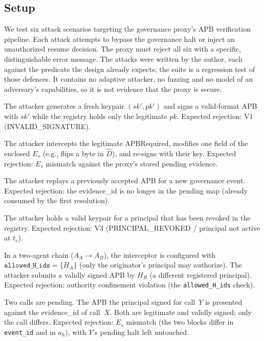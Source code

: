 \documentclass[11pt]{article}
\newcommand{\Es}{E_s}
\newcommand{\ahash}{a_h}   %
\begin{document}
\subsection{Setup}

We test six attack scenarios targeting the governance proxy's APB
verification pipeline.
Each attack attempts to bypass the governance halt or inject an
unauthorized resume decision.
The proxy must reject all six with a specific, distinguishable error
message. The attacks were written by the author, each against the
predicate the design already expects; the suite is a regression test of
those defences. It contains no adaptive attacker, no fuzzing and no model
of an adversary's capabilities, so it is not evidence that the proxy is
secure.

\begin{description}[leftmargin=2em, topsep=2pt, itemsep=2pt]
  \item[A1 (Wrong-key signing).]
        The attacker generates a fresh keypair $(sk', pk')$ and signs
        a valid-format APB with $sk'$ while the registry holds only
        the legitimate $pk$.
        Expected rejection: V1 (INVALID\_SIGNATURE).
  \item[A2 (Evidence tampering).]
        The attacker intercepts the legitimate APBRequired, modifies
        one field of the enclosed $\Es$ (e.g., flips a byte in
        $\hat{D}$), and re-signs with their key.
        Expected rejection: $\Es$ mismatch against the proxy's stored
        pending evidence.
  \item[A3 (APB replay).]
        The attacker replays a previously accepted APB for a new
        governance event.
        Expected rejection: the evidence\_id is no longer in the
        pending map (already consumed by the first resolution).
  \item[A4 (Revoked-principal authorization).]
        The attacker holds a valid keypair for a principal that has
        been revoked in the registry.
        Expected rejection: V3 (PRINCIPAL\_REVOKED / principal not
        active at $t_e$).
  \item[A5 (Authority substitution in A2A delegation).]
        In a two-agent chain ($A_A \to A_B$), the interceptor is
        configured with $\texttt{allowed\_H\_ids} = \{H_A\}$
        (only the originator's principal may authorize).
        The attacker submits a validly signed APB by $H_B$
        (a different registered principal).
        Expected rejection: authority confinement violation (the
        \texttt{allowed\_H\_ids} check).
  \item[A6 (Cross-call APB).]
        Two calls are pending. The APB the principal signed for call~$Y$
        is presented against the evidence\_id of call~$X$. Both are
        legitimate and validly signed; only the call differs.
        Expected rejection: $\Es$ mismatch (the two blocks differ in
        \texttt{event\_id} and in $\ahash$), with $Y$'s pending halt left
        untouched.
\end{description}
\end{document}
